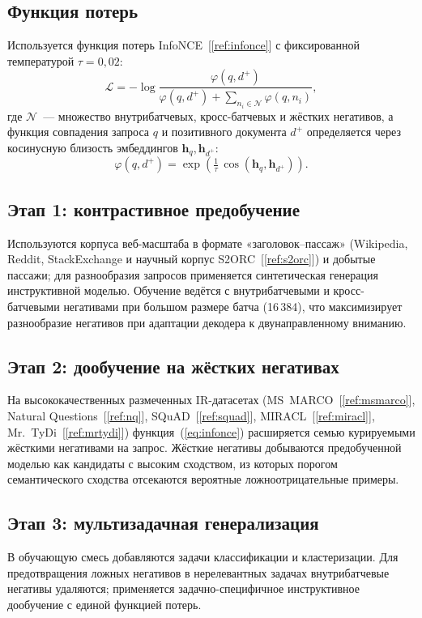 \documentclass[12pt,a4paper]{article}
\begin{document}
\subsection{Функция потерь}
Используется функция потерь InfoNCE~[\ref{ref:infonce}] с фиксированной
температурой $\tau = 0{,}02$:
\begin{equation}\label{eq:infonce}
  \mathcal{L} = -\log
  \frac{\varphi(q, d^{+})}{\varphi(q, d^{+}) + \sum_{n_i \in \mathcal{N}} \varphi(q, n_i)},
\end{equation}
где $\mathcal{N}$~--- множество внутрибатчевых, кросс-батчевых и жёстких
негативов, а функция совпадения запроса $q$ и позитивного документа $d^{+}$
определяется через косинусную близость эмбеддингов $\mathbf{h}_q,\mathbf{h}_{d^{+}}$:
\begin{equation}\label{eq:match}
  \varphi(q, d^{+}) = \exp\!\left(\tfrac{1}{\tau}\,\cos(\mathbf{h}_q, \mathbf{h}_{d^{+}})\right).
\end{equation}

\subsection{Этап 1: контрастивное предобучение}
Используются корпуса веб-масштаба в формате «заголовок--пассаж» (Wikipedia,
Reddit, StackExchange и научный корпус S2ORC~[\ref{ref:s2orc}]) и добытые
пассажи; для разнообразия запросов применяется синтетическая генерация
инструктивной моделью. Обучение ведётся с внутрибатчевыми и кросс-батчевыми
негативами при большом размере батча (16\,384), что максимизирует разнообразие
негативов при адаптации декодера к двунаправленному вниманию.

\subsection{Этап 2: дообучение на жёстких негативах}
На высококачественных размеченных IR-датасетах (MS~MARCO~[\ref{ref:msmarco}],
Natural Questions~[\ref{ref:nq}], SQuAD~[\ref{ref:squad}],
MIRACL~[\ref{ref:miracl}], Mr.~TyDi~[\ref{ref:mrtydi}]) функция~(\ref{eq:infonce})
расширяется семью курируемыми жёсткими негативами на запрос. Жёсткие негативы
добываются предобученной моделью как кандидаты с высоким сходством, из которых
порогом семантического сходства отсекаются вероятные ложноотрицательные
примеры.

\subsection{Этап 3: мультизадачная генерализация}
В обучающую смесь добавляются задачи классификации и кластеризации. Для
предотвращения ложных негативов в нерелевантных задачах внутрибатчевые негативы
удаляются; применяется задачно-специфичное инструктивное дообучение с единой
функцией потерь.
\end{document}
